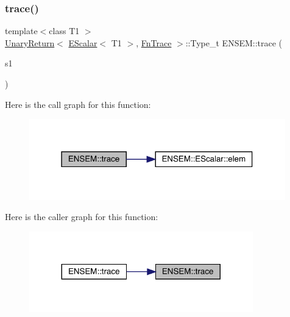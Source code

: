 \subsubsection{\texorpdfstring{trace()}{trace()}}
{\footnotesize\ttfamily template$<$class T1 $>$ \\
\mbox{\hyperlink{structENSEM_1_1UnaryReturn}{Unary\+Return}}$<$ \mbox{\hyperlink{classENSEM_1_1EScalar}{E\+Scalar}}$<$ T1 $>$, \mbox{\hyperlink{structENSEM_1_1FnTrace}{Fn\+Trace}} $>$\+::Type\+\_\+t E\+N\+S\+E\+M\+::trace (\begin{DoxyParamCaption}\item[{const \mbox{\hyperlink{classENSEM_1_1EScalar}{E\+Scalar}}$<$ T1 $>$ \&}]{s1 }\end{DoxyParamCaption})\hspace{0.3cm}{\ttfamily [inline]}}

Here is the call graph for this function\+:
\nopagebreak
\begin{figure}[H]
\begin{center}
\leavevmode
\includegraphics[width=315pt]{d4/dca/group__escalar_ga4c3bf5ecccbf7b690868af26ec7d8ca6_cgraph}
\end{center}
\end{figure}
Here is the caller graph for this function\+:
\nopagebreak
\begin{figure}[H]
\begin{center}
\leavevmode
\includegraphics[width=275pt]{d4/dca/group__escalar_ga4c3bf5ecccbf7b690868af26ec7d8ca6_icgraph}
\end{center}
\end{figure}
\mbox{\label{group__escalar_gad2c4bd25b83ec8aa100ff58b6b773d8c}} 
